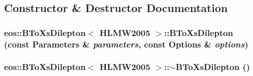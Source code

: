 \subsection{Constructor \& Destructor Documentation}
\hypertarget{classeos_1_1BToXsDilepton_3_01HLMW2005_01_4_a997b4d786efbb0ff51c97a713d9ebc6a}{
\subsubsection[{BToXsDilepton}]{\setlength{\rightskip}{0pt plus 5cm}eos::BToXsDilepton$<$ {\bf HLMW2005} $>$::BToXsDilepton (const {\bf Parameters} \& {\em parameters}, \/  const {\bf Options} \& {\em options})}}
\label{classeos_1_1BToXsDilepton_3_01HLMW2005_01_4_a997b4d786efbb0ff51c97a713d9ebc6a}
\hypertarget{classeos_1_1BToXsDilepton_3_01HLMW2005_01_4_aca8fb79f169510f38c606b37f9ee6567}{
\subsubsection[{$\sim$BToXsDilepton}]{\setlength{\rightskip}{0pt plus 5cm}eos::BToXsDilepton$<$ {\bf HLMW2005} $>$::$\sim$BToXsDilepton ()}}
\label{classeos_1_1BToXsDilepton_3_01HLMW2005_01_4_aca8fb79f169510f38c606b37f9ee6567}


